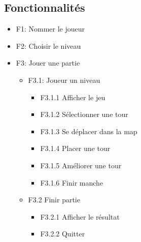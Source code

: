 \documentclass[a4paper]{article}
\begin{document}
        \subsection{Fonctionnalités}
        \begin{itemize}
        \item F1: Nommer le joueur
        \item F2: Choisir le niveau
        \item F3: Jouer une partie
        
    
        \begin{itemize}
          \item F3.1: Joueur un niveau
          \begin{itemize}
          \item F3.1.1 Afficher le jeu
          \item F3.1.2 Sélectionner une tour
          \item F3.1.3 Se déplacer dans la map
          \item F3.1.4 Placer une tour
          \item F3.1.5 Améliorer une tour
          \item F3.1.6 Finir manche
          \newline
        \end{itemize}
        
          \item F3.2 Finir partie
            \begin{itemize}
        \item F3.2.1 Afficher le résultat
        \item F3.2.2 Quitter
            \end{itemize}
            \end{itemize}
            \end{itemize}
\end{document}
